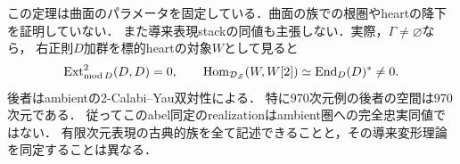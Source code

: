 \begin{remark}[古典的表現族と導来変形の境界]\label{rem:classical-not-derived}
この定理は曲面のパラメータを固定している．曲面の族での根圏やheartの降下を証明していない．
また導来表現stackの同値も主張しない．実際，$\Gamma\ne\varnothing$なら，
右正則$D$加群を標的heartの対象$W$として見ると
\[
 \operatorname{Ext}^2_{\operatorname{mod}D}(D,D)=0,
 \qquad
 \operatorname{Hom}_{\mathcal D_{\mathcal Z}}(W,W[2])\simeq\operatorname{End}_D(D)^*\ne0.
\]
後者はambientの2-Calabi--Yau双対性による．
特に970次元例の後者の空間は970次元である．
従ってこのabel同定のrealizationはambient圏への完全忠実同値ではない．
有限次元表現の古典的族を全て記述できることと，その導来変形理論を同定することは異なる．
\end{remark}
